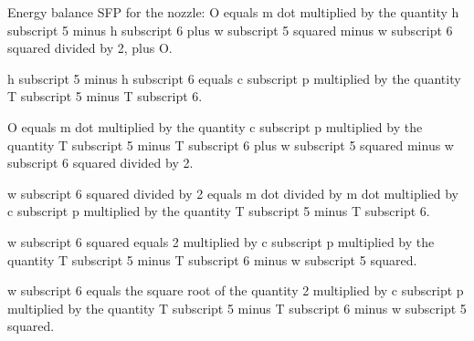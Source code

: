 Energy balance SFP for the nozzle:  
O equals m dot multiplied by the quantity h subscript 5 minus h subscript 6 plus w subscript 5 squared minus w subscript 6 squared divided by 2, plus O.  

h subscript 5 minus h subscript 6 equals c subscript p multiplied by the quantity T subscript 5 minus T subscript 6.  

O equals m dot multiplied by the quantity c subscript p multiplied by the quantity T subscript 5 minus T subscript 6 plus w subscript 5 squared minus w subscript 6 squared divided by 2.  

w subscript 6 squared divided by 2 equals m dot divided by m dot multiplied by c subscript p multiplied by the quantity T subscript 5 minus T subscript 6.  

w subscript 6 squared equals 2 multiplied by c subscript p multiplied by the quantity T subscript 5 minus T subscript 6 minus w subscript 5 squared.  

w subscript 6 equals the square root of the quantity 2 multiplied by c subscript p multiplied by the quantity T subscript 5 minus T subscript 6 minus w subscript 5 squared.